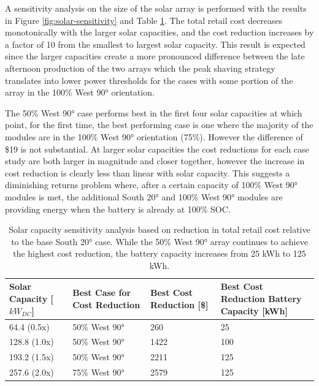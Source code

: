 \documentclass[
]{article}
\begin{document}
A sensitivity analysis on the size of the solar array is performed with
the results in Figure \ref{fig:solar-sensitivity} and Table \ref{tab:solar-sensitivity}. The total retail cost decreases monotonically
with the larger solar capacities, and the cost reduction increases by a
factor of 10 from the smallest to largest solar capacity. This result is
expected since the larger capacities create a more pronounced difference
between the late afternoon production of the two arrays which the peak
shaving strategy translates into lower power thresholds for the cases
with some portion of the array in the 100\% West 90° orientation.

The 50\% West 90° case performs best in the first four solar capacities
at which point, for the first time, the best performing case is one
where the majority of the modules are in the 100\% West 90° orientation
(75\%). However the difference of \$19 is not substantial. At larger
solar capacities the cost reductions for each case study are both larger
in magnitude and closer together, however the increase in cost reduction
is clearly less than linear with solar capacity. This suggests a
diminishing returns problem where, after a certain capacity of 100\%
West 90° modules is met, the additional South 20° and 100\% West 90°
modules are providing energy when the battery is already at 100\% SOC.


\begin{table}[!h]
  \centering
  \caption{Solar capacity sensitivity analysis based on reduction in total
  retail cost relative to the base South 20° case. While the 50\% West 90°
  array continues to achieve the highest cost reduction, the battery
  capacity increases from 25 kWh to 125 kWh.}
  \label{tab:solar-sensitivity}
  \begin{tabularx}{\textwidth}{XXXX}
    \toprule
    Solar Capacity {[}\(kW_{DC}\){]} & Best Case for Cost Reduction         & Best
    Cost Reduction {[}\${]}          & Best Cost Reduction Battery Capacity
    {[}kWh{]}\\
    \midrule
    64.4 (0.5x)                      & 50\% West 90°                        & 260  & 25\\
    128.8 (1.0x)                     & 50\% West 90°                        & 1422 & 100\\
    193.2 (1.5x)                     & 50\% West 90°                        & 2211 & 125\\
    257.6 (2.0x)                     & 75\% West 90°                        & 2579 & 125\\
    \bottomrule
  \end{tabularx}
\end{table}
\end{document}
